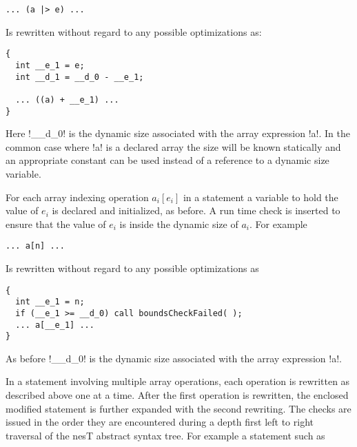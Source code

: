 \singlespace
\vspace{1.0ex}
\begin{lstlisting}[language=nesC]
... (a |> e) ...
\end{lstlisting}
\vspace{1.0ex}
\primaryspacing

Is rewritten without regard to any possible optimizations as:

\singlespace
\vspace{1.0ex}
\begin{lstlisting}[language=nesC]
{
  int __e_1 = e;
  int __d_1 = __d_0 - __e_1;

  ... ((a) + __e_1) ...
}
\end{lstlisting}
\vspace{1.0ex}
\primaryspacing

Here !__d_0! is the dynamic size associated with the array expression !a!. In the common case
where !a! is a declared array the size will be known statically and an appropriate constant can
be used instead of a reference to a dynamic size variable.

For each array indexing operation $a_i[e_i]$ in a statement a variable to hold the value of
$e_i$ is declared and initialized, as before. A run time check is inserted to ensure that the
value of $e_i$ is inside the dynamic size of $a_i$. For example

\singlespace
\vspace{1.0ex}
\begin{lstlisting}[language=nesC]
... a[n] ...
\end{lstlisting}
\vspace{1.0ex}
\primaryspacing

Is rewritten without regard to any possible optimizations as

\singlespace
\vspace{1.0ex}
\begin{lstlisting}[language=nesC]
{
  int __e_1 = n;
  if (__e_1 >= __d_0) call boundsCheckFailed( );
  ... a[__e_1] ...
}
\end{lstlisting}
\vspace{1.0ex}
\primaryspacing

As before !__d_0! is the dynamic size associated with the array expression !a!.

In a statement involving multiple array operations, each operation is rewritten as described
above one at a time. After the first operation is rewritten, the enclosed modified statement is
further expanded with the second rewriting. The checks are issued in the order they are
encountered during a depth first left to right traversal of the nesT abstract syntax tree. For
example a statement such as


